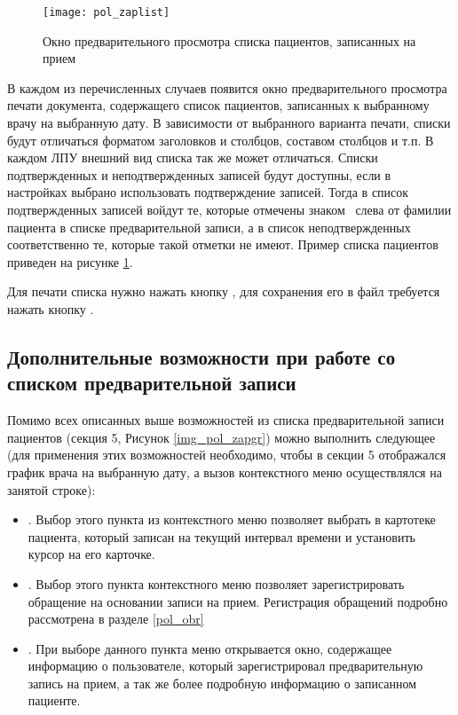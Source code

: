 \begin{figure}[ht]\centering
 \texttt{[image: pol\_zaplist]}
 \caption{Окно предварительного просмотра списка пациентов, записанных на прием}
 \label{img_pol_zaplist}
\end{figure}

В каждом из перечисленных случаев появится окно предварительного просмотра печати документа, содержащего список пациентов, записанных к выбранному врачу на выбранную дату. В зависимости от выбранного варианта печати, списки будут отличаться форматом заголовков и столбцов, составом столбцов и т.п. В каждом ЛПУ внешний вид списка так же может отличаться. Списки подтвержденных и неподтвержденных записей будут доступны, если в настройках выбрано использовать подтверждение записей. Тогда в список подтвержденных записей войдут те, которые отмечены знаком \putx~слева от фамилии пациента в списке предварительной записи, а в список неподтвержденных соответственно те, которые такой отметки не имеют. Пример списка пациентов приведен на рисунке \ref{img_pol_zaplist}.

Для печати списка нужно нажать кнопку , для сохранения его в файл требуется нажать кнопку  .

\subsection{Дополнительные возможности при работе со списком предварительной записи} \label{pol_zapdop}

Помимо всех описанных выше возможностей из списка предварительной записи пациентов (секция 5, Рисунок \ref{img_pol_zapgr}) можно выполнить следующее (для применения этих возможностей необходимо, чтобы в секции 5 отображался график врача на выбранную дату, а вызов контекстного меню осуществлялся на занятой строке):
\begin{itemize}
 \item {}. Выбор этого пункта из контекстного меню позволяет выбрать в картотеке пациента, который записан на текущий интервал времени и установить курсор на его карточке.
 \item {}. Выбор этого пункта контекстного меню позволяет зарегистрировать обращение на основании записи на прием. Регистрация обращений подробно рассмотрена в разделе \ref{pol_obr}
 \item {}. При выборе данного пункта меню открывается окно, содержащее информацию о пользователе, который зарегистрировал предварительную запись на прием, а так же более подробную информацию о записанном пациенте.
\end{itemize} 

